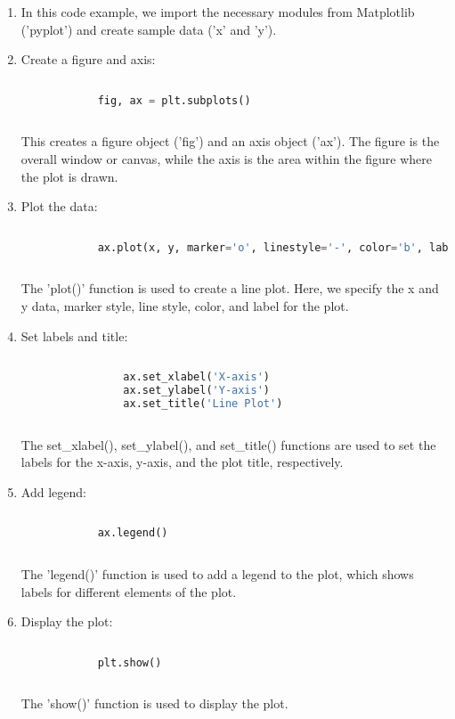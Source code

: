 \begin{enumerate}
	\item In this code example, we import the necessary modules from Matplotlib ('pyplot') and create sample data ('x' and 'y').
	
	\item Create a figure and axis:
		\begin{lstlisting}[language=Python]
			
			fig, ax = plt.subplots()
						
		\end{lstlisting}
	
		This creates a figure object ('fig') and an axis object ('ax'). The figure is the overall window or canvas, while the axis is the area within the figure where the plot is drawn.
	
	\item Plot the data:
		\begin{lstlisting}[language=Python]
			
			ax.plot(x, y, marker='o', linestyle='-', color='b', label='Data')
						
		\end{lstlisting}
		
		The 'plot()' function is used to create a line plot. Here, we specify the x and y data, marker style, line style, color, and label for the plot.
	
	\item Set labels and title:
		\begin{lstlisting}[language=Python]
				
				ax.set_xlabel('X-axis')
				ax.set_ylabel('Y-axis')
				ax.set_title('Line Plot')
								
		\end{lstlisting}
		
			The set\_xlabel(), set\_ylabel(), and set\_title() functions are used to set the labels for the x-axis, y-axis, and the plot title, respectively.
			
	\item Add legend:
		\begin{lstlisting}[language=Python]
			
			ax.legend()
						
		\end{lstlisting}
	
		The 'legend()' function is used to add a legend to the plot, which shows labels for different elements of the plot.
		
	\item Display the plot:
		\begin{lstlisting}[language=Python]
			
			plt.show()
						
		\end{lstlisting}
	
		The 'show()' function is used to display the plot.
			
\end{enumerate}


